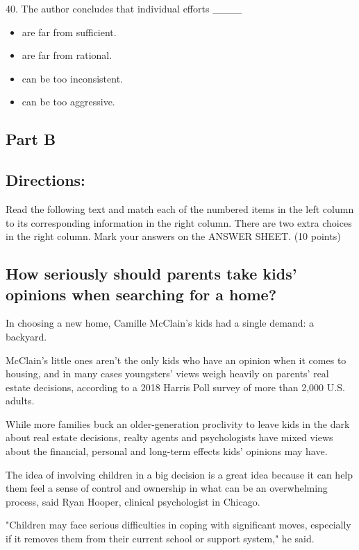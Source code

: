 \documentclass[UTF8,11pt]{ctexart}
\begin{document}
40. The author concludes that individual efforts \_\_\_\_


\begin{itemize}[leftmargin=2em,itemsep=.2em,topsep=.4em]\item[A.] are far from sufficient.
\item[B.] are far from rational.
\item[C.] can be too inconsistent.
\item[D.] can be too aggressive.
\end{itemize}

\subsection*{\textbf{Part B}}


\subsection*{\textbf{Directions:}}


Read the following text and match each of the numbered items in the left column to its corresponding information in the right column. There are two extra choices in the right column. Mark your answers on the ANSWER SHEET. (10 points)


\subsection*{\textbf{How seriously should parents take kids' opinions when searching for a home?}}


In choosing a new home, Camille McClain's kids had a single demand: a backyard.


McClain's little ones aren't the only kids who have an opinion when it comes to housing, and in many cases youngsters' views weigh heavily on parents' real estate decisions, according to a 2018 Harris Poll survey of more than 2,000 U.S. adults.


While more families buck an older-generation proclivity to leave kids in the dark about real estate decisions, realty agents and psychologists have mixed views about the financial, personal and long-term effects kids' opinions may have.


The idea of involving children in a big decision is a great idea because it can help them feel a sense of control and ownership in what can be an overwhelming process, said Ryan Hooper, clinical psychologist in Chicago.


"Children may face serious difficulties in coping with significant moves, especially if it removes them from their current school or support system," he said.
\end{document}
